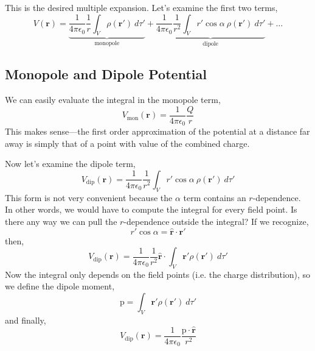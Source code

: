 \documentclass[12pt]{report}
\numberwithin{equation}{section}
\def\p{{\mbox{$\boldsymbol{\mathrm{p}}$}}}
\begin{document}
	This is the desired multiple expansion. Let's examine the first two terms,
	\begin{equation}
		V(\boldsymbol{r}) = \underbrace{\frac{1}{4\pi\epsilon_0}\frac{1}{r}\int_V \rho(\boldsymbol{r}')\ d\tau' }_\text{monopole}+  \underbrace{\frac{1}{4\pi\epsilon_0}\frac{1}{r^2}\int_Vr'\cos\alpha\  \rho(\boldsymbol{r}')\ d\tau' }_\text{dipole}+ \dots
	\end{equation}
	
	\subsection{Monopole and Dipole Potential}
	We can easily evaluate the integral in the monopole term,
	\begin{equation}
		\boxed{V_\text{mon}(\boldsymbol{r}) = \frac{1}{4\pi\epsilon_0}\frac{Q}{r}}
	\end{equation}
	This makes sense---the first order approximation of the potential at a distance far away is simply that of a point with value of the combined charge.
	
	Now let's examine the dipole term,
	\begin{equation}
		V_\text{dip}(\boldsymbol{r}) = \frac{1}{4\pi\epsilon_0}\frac{1}{r^2}\int_Vr'\cos\alpha\  \rho(\boldsymbol{r}')\ d\tau' 
	\end{equation}
	This form is not very convenient because the $ \alpha $ term contains an $ r $-dependence. In other words, we would have to compute the integral for every field point. Is there any way we can pull the $ r $-dependence outside the integral? If we recognize,
	\begin{equation}
		r'\cos\alpha = \boldsymbol{\hat{r}}\cdot \boldsymbol{r}'
	\end{equation}
	then,
	\begin{equation}
		V_\text{dip}(\boldsymbol{r}) = \frac{1}{4\pi\epsilon_0}\frac{1}{r^2}\boldsymbol{\hat{r}}\cdot \int_V \boldsymbol{r}'\rho(\boldsymbol{r}')\ d\tau'
	\end{equation}
	Now the integral only depends on the field points (i.e. the charge distribution), so we define the dipole moment,
	\begin{equation}
		\boxed{\p= \int_V \boldsymbol{r}'\rho(\boldsymbol{r}')\ d\tau'}
	\end{equation}
	and finally, 
	\begin{equation}
		\boxed{V_\text{dip}(\boldsymbol{r}) = \frac{1}{4\pi\epsilon_0}\frac{\p\cdot \hat{\boldsymbol{r}}}{r^2}}
		\label{eq:dip}
	\end{equation}
	
\end{document}
